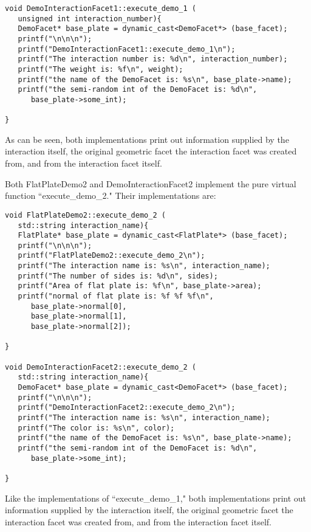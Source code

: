\begin{description}
\begin{verbatim}
void DemoInteractionFacet1::execute_demo_1 (
   unsigned int interaction_number){
   DemoFacet* base_plate = dynamic_cast<DemoFacet*> (base_facet);
   printf("\n\n\n");
   printf("DemoInteractionFacet1::execute_demo_1\n");
   printf("The interaction number is: %d\n", interaction_number);
   printf("The weight is: %f\n", weight);
   printf("the name of the DemoFacet is: %s\n", base_plate->name);
   printf("the semi-random int of the DemoFacet is: %d\n",
      base_plate->some_int);

}

\end{verbatim}

As can be seen, both implementations print out information supplied
by the interaction itself, the original geometric facet the
interaction facet was created from, and from the interaction facet
itself.

Both FlatPlateDemo2 and DemoInteractionFacet2 implement the pure
virtual function ``execute\_demo\_2." Their implementations are:

\begin{verbatim}
void FlatPlateDemo2::execute_demo_2 (
   std::string interaction_name){
   FlatPlate* base_plate = dynamic_cast<FlatPlate*> (base_facet);
   printf("\n\n\n");
   printf("FlatPlateDemo2::execute_demo_2\n");
   printf("The interaction name is: %s\n", interaction_name);
   printf("The number of sides is: %d\n", sides);
   printf("Area of flat plate is: %f\n", base_plate->area);
   printf("normal of flat plate is: %f %f %f\n",
      base_plate->normal[0],
      base_plate->normal[1],
      base_plate->normal[2]);

}

void DemoInteractionFacet2::execute_demo_2 (
   std::string interaction_name){
   DemoFacet* base_plate = dynamic_cast<DemoFacet*> (base_facet);
   printf("\n\n\n");
   printf("DemoInteractionFacet2::execute_demo_2\n");
   printf("The interaction name is: %s\n", interaction_name);
   printf("The color is: %s\n", color);
   printf("the name of the DemoFacet is: %s\n", base_plate->name);
   printf("the semi-random int of the DemoFacet is: %d\n",
      base_plate->some_int);

}
\end{verbatim}

Like the implementations of ``execute\_demo\_1,"
both implementations print out information supplied
by the interaction itself, the original geometric facet the
interaction facet was created from, and from the interaction facet
itself.


\end{description}
